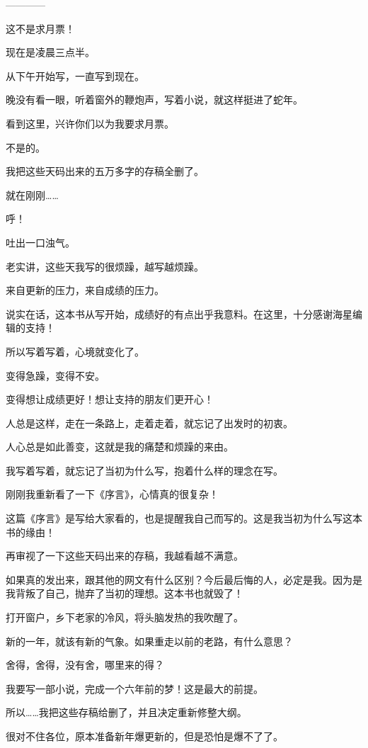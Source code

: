 \begin{this_body}
------------

这不是求月票！

现在是凌晨三点半。

从下午开始写，一直写到现在。

晚没有看一眼，听着窗外的鞭炮声，写着小说，就这样挺进了蛇年。

看到这里，兴许你们以为我要求月票。

不是的。

我把这些天码出来的五万多字的存稿全删了。

就在刚刚……

呼！

吐出一口浊气。

老实讲，这些天我写的很烦躁，越写越烦躁。

来自更新的压力，来自成绩的压力。

说实在话，这本书从写开始，成绩好的有点出乎我意料。在这里，十分感谢海星编辑的支持！

所以写着写着，心境就变化了。

变得急躁，变得不安。

变得想让成绩更好！想让支持的朋友们更开心！

人总是这样，走在一条路上，走着走着，就忘记了出发时的初衷。

人心总是如此善变，这就是我的痛楚和烦躁的来由。

我写着写着，就忘记了当初为什么写，抱着什么样的理念在写。

刚刚我重新看了一下《序言》，心情真的很复杂！

这篇《序言》是写给大家看的，也是提醒我自己而写的。这是我当初为什么写这本书的缘由！

再审视了一下这些天码出来的存稿，我越看越不满意。

如果真的发出来，跟其他的网文有什么区别？今后最后悔的人，必定是我。因为是我背叛了自己，抛弃了当初的理想。这本书也就毁了！

打开窗户，乡下老家的冷风，将头脑发热的我吹醒了。

新的一年，就该有新的气象。如果重走以前的老路，有什么意思？

舍得，舍得，没有舍，哪里来的得？

我要写一部小说，完成一个六年前的梦！这是最大的前提。

所以……我把这些存稿给删了，并且决定重新修整大纲。

很对不住各位，原本准备新年爆更新的，但是恐怕是爆不了了。


\end{this_body}

